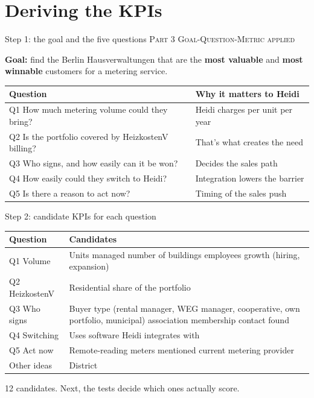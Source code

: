 \documentclass[aspectratio=169,11pt]{beamer}
\newcommand{\partlabel}[1]{{\small\color{assume}\textsc{#1}}\par\vspace{0.3em}}
\begin{document}
\section{Deriving the KPIs}

\begin{frame}{Step 1: the goal and the five questions}
  \partlabel{Part 3 \textbullet{} Goal-Question-Metric applied}
  \textbf{Goal:} find the Berlin Hausverwaltungen that are the \textbf{most valuable} and
  \textbf{most winnable} customers for a metering service.
  \vspace{0.6em}

  \begin{tabular}{@{}p{6.6cm} p{6.4cm}@{}}
    \toprule
    \textbf{Question} & \textbf{Why it matters to Heidi} \\
    \midrule
    Q1 How much metering volume could they bring? & Heidi charges per unit per year \\
    Q2 Is the portfolio covered by HeizkostenV billing? & That's what creates the need \\
    Q3 Who signs, and how easily can it be won? & Decides the sales path \\
    Q4 How easily could they switch to Heidi? & Integration lowers the barrier \\
    Q5 Is there a reason to act now? & Timing of the sales push \\
    \bottomrule
  \end{tabular}
\end{frame}

\begin{frame}{Step 2: candidate KPIs for each question}
  \small
  \begin{tabular}{@{}p{3.0cm} p{9.8cm}@{}}
    \toprule
    \textbf{Question} & \textbf{Candidates} \\
    \midrule
    Q1 Volume & Units managed \textbullet{} number of buildings \textbullet{} employees
      \textbullet{} growth (hiring, expansion) \\
    Q2 HeizkostenV & Residential share of the portfolio \\
    Q3 Who signs & Buyer type (rental manager, WEG manager, cooperative, own portfolio,
      municipal) \textbullet{} association membership \textbullet{} contact found \\
    Q4 Switching & Uses software Heidi integrates with \\
    Q5 Act now & Remote-reading meters mentioned \textbullet{} current metering provider \\
    Other ideas & District \\
    \bottomrule
  \end{tabular}
  \vspace{0.6em}

  12 candidates. Next, the tests decide which ones actually score.
\end{frame}
\end{document}
